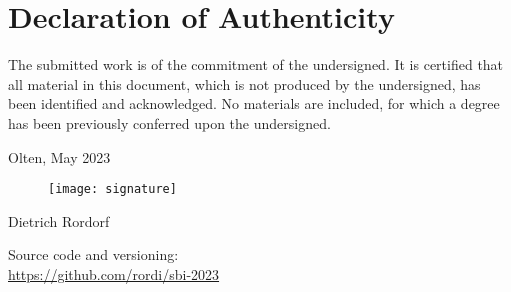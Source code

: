 \vspace*{3cm}

\section*{Declaration of Authenticity}

The submitted work is of the commitment of the undersigned. It is certified that all material
in this document, which is not produced by the undersigned, has been identified and acknowledged.
No materials are included, for which a degree has been previously conferred upon the undersigned.

\vspace*{1cm} 
\noindent Olten, May 2023

\begin{figure}[h!]
    \texttt{[image: signature]}
\end{figure}
\noindent Dietrich Rordorf

\vspace*{2cm} 

\noindent Source code and versioning:\\
\url{https://github.com/rordi/sbi-2023}

